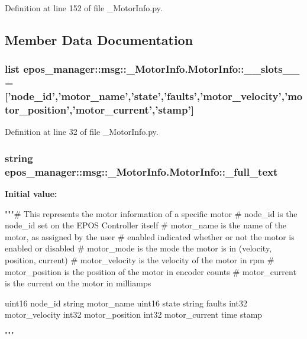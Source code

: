 \-Definition at line 152 of file \-\_\-\-Motor\-Info.\-py.



\subsection{\-Member \-Data \-Documentation}
\subsubsection[{\-\_\-\-\_\-slots\-\_\-\-\_\-}]{\setlength{\rightskip}{0pt plus 5cm}list {\bf epos\-\_\-manager\-::msg\-::\-\_\-\-Motor\-Info.\-Motor\-Info\-::\-\_\-\-\_\-slots\-\_\-\-\_\-} = ['{\bf node\-\_\-id}','{\bf motor\-\_\-name}','{\bf state}','{\bf faults}','{\bf motor\-\_\-velocity}','{\bf motor\-\_\-position}','{\bf motor\-\_\-current}','{\bf stamp}']\hspace{0.3cm}{\ttfamily  [static, private]}}\label{classepos__manager_1_1msg_1_1__MotorInfo_1_1MotorInfo_aafc8f9cb54f5d3dddf979dbf0d3202ba}


\-Definition at line 32 of file \-\_\-\-Motor\-Info.\-py.

\subsubsection[{\-\_\-full\-\_\-text}]{\setlength{\rightskip}{0pt plus 5cm}string {\bf epos\-\_\-manager\-::msg\-::\-\_\-\-Motor\-Info.\-Motor\-Info\-::\-\_\-full\-\_\-text}\hspace{0.3cm}{\ttfamily  [static, private]}}\label{classepos__manager_1_1msg_1_1__MotorInfo_1_1MotorInfo_a02e4bf9c5f4fec567b15c314632644c4}
{\bfseries \-Initial value\-:}
\begin{DoxyCode}
"""# This represents the motor information of a specific motor
# node_id is the node_id set on the EPOS Controller itself
# motor_name is the name of the motor, as assigned by the user
# enabled indicated whether or not the motor is enabled or disabled
# motor_mode is the mode the motor is in (velocity, position, current)
# motor_velocity is the velocity of the motor in rpm
# motor_position is the position of the motor in encoder counts
# motor_current is the current on the motor in milliamps

uint16 node_id
string motor_name
uint16 state
string faults
int32 motor_velocity
int32 motor_position
int32 motor_current
time stamp

"""
\end{DoxyCode}


